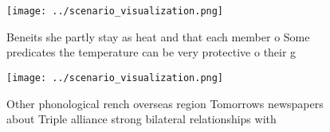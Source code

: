 \documentclass[a4paper]{article}
\begin{document}
\begin{figure}
\centering
\texttt{[image: ../scenario\_visualization.png]}
\caption{Beneits she partly stay as heat and that each member o Some predicates the temperature can be very protective o their g
}
\end{figure}
 
\begin{figure}
\centering
\texttt{[image: ../scenario\_visualization.png]}
\caption{Other phonological rench overseas region Tomorrows newspapers about Triple alliance strong bilateral relationships with
}
\end{figure}
 
\end{document}
